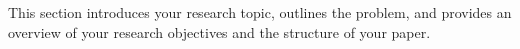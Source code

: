 This section introduces your research topic, outlines the problem, and provides an overview of your research objectives and the structure of your paper.
